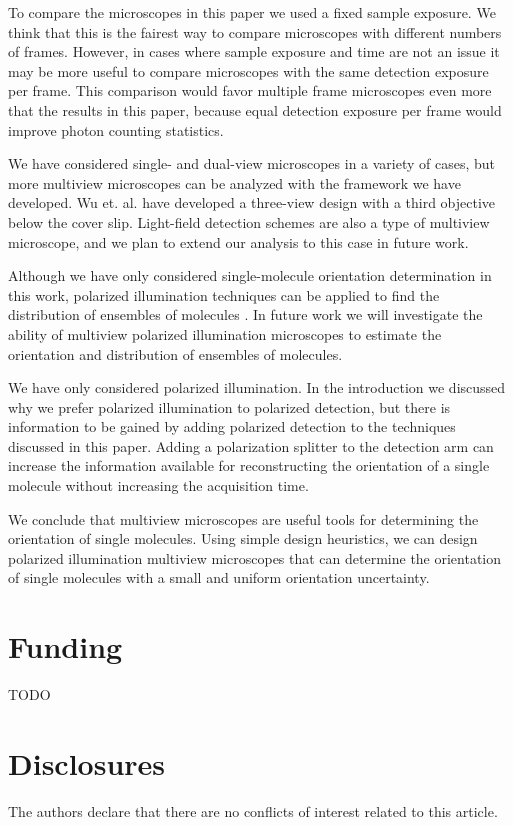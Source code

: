 \documentclass[10pt]{article}
\begin{document}
To compare the microscopes in this paper we used a fixed sample exposure. We
think that this is the fairest way to compare microscopes with different numbers
of frames. However, in cases where sample exposure and time are not an issue it
may be more useful to compare microscopes with the same detection exposure per
frame. This comparison would favor multiple frame microscopes even more that the
results in this paper, because equal detection exposure per frame would improve
photon counting statistics.

We have considered single- and dual-view microscopes in a variety of cases, but
more multiview microscopes can be analyzed with the framework we have
developed. Wu et. al. have developed a three-view design with a third objective
below the cover slip\cite{wu2016}. Light-field detection schemes are also a type
of multiview microscope\cite{levoy2006}, and we plan to extend our analysis to
this case in future work.

Although we have only considered single-molecule orientation determination in
this work, polarized illumination techniques can be applied to find the
distribution of ensembles of molecules \cite{mehta2016, backer2016}. In future
work we will investigate the ability of multiview polarized illumination
microscopes to estimate the orientation and distribution of ensembles of
molecules.

We have only considered polarized illumination. In the introduction
we discussed why we prefer polarized illumination to polarized detection, but
there is information to be gained by adding polarized detection to the
techniques discussed in this paper. Adding a polarization splitter to the
detection arm can increase the information available for reconstructing the
orientation of a single molecule without increasing the acquisition time.

We conclude that multiview microscopes are useful tools for determining the
orientation of single molecules. Using simple design heuristics, we can design
polarized illumination multiview microscopes that can determine the orientation
of single molecules with a small and uniform orientation uncertainty.

\section*{Funding}
TODO

\section*{Disclosures}
The authors declare that there are no conflicts of interest related to this article.
\end{document}

